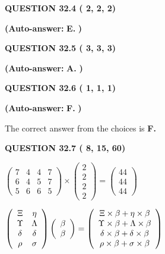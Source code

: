 \documentclass[12pt]{article}
\begin{document}
  
\noindent{}
 
 
  
  
{\textbf{\large{QUESTION
32.4 
 (          2,          2,          2)
}}}
 
 
{\textbf{(Auto-answer:}}
{\textbf{\large{
E.}}}
{\textbf{)}}
 
 
  
  
{\textbf{\large{QUESTION
32.5 
 (          3,          3,          3)
}}}
 
 
{\textbf{(Auto-answer:}}
{\textbf{\large{
A.}}}
{\textbf{)}}
 
 
  
  
{\textbf{\large{QUESTION
32.6 
 (          1,          1,          1)
}}}
 
 
{\textbf{(Auto-answer:}}
{\textbf{\large{
F.}}}
{\textbf{)}}
 
 

The correct answer from the choices is
{\textbf{\large{
F.}}}
 
  
  
{\textbf{\large{QUESTION
32.7 
 (          8,         15,         60)
}}}

 
$\left( \begin{array}{ccccccccccccccc}
           7 & 
           4 & 
           4 & 
           7 \\ 
           6 & 
           4 & 
           5 & 
           7 \\ 
           5 & 
           6 & 
           6 & 
           5
\end{array}\right) \times
\left( \begin{array}{c}
           2 \\ 
           2 \\ 
           2 \\ 
           2
\end{array}\right)  =
\left( \begin{array}{c}
          44 \\ 
          44 \\ 
          44
\end{array}\right)  $
 
$  %
 \left( \begin{array}
 {
 c
 c
 }
                    \Xi & 
 \eta \\ 
 \Upsilon & 
 \Lambda \\ 
 \delta & 
 \delta \\ 
 \rho & 
 \sigma
 \end{array} \right)
 \left( \begin{array}
 {
 c
 }
 \beta \\ 
 \beta
 \end{array} \right)
=
  \left( \begin{array}
 {
 c
 }
                    \Xi \times  \beta   +  \eta \times  \beta \\ 
 \Upsilon \times  \beta   +  \Lambda \times  \beta \\ 
 \delta \times  \beta   +  \delta \times  \beta \\ 
 \rho \times  \beta   +  \sigma \times  \beta
 \end{array} \right)
$
 
\end{document}
